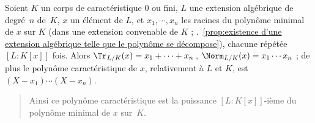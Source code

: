 \documentclass[11pt, %
  title in boldface,
  theorem in new line,
  theorem numbering = section,
  number theorems separately,
  simple name,
]{beaulivre}
\begin{document}
    \begin{proposition}\label{prop:trace;norme;polynôme caractéristique;extension}
        Soient \( K \) un corps de caractéristique \( 0 \) ou fini, \( L \) une extension algébrique de degré~\( n \) de~\( K \), \( x \) un élément de \( L \), et \( x_1, \cdots, x_n \) les racines du polynôme minimal de \( x \) sur \( K \) (dans une extension convenable de \( K \) ; \cf.~\cref{prop:existence d'une extension algébrique telle que le polynôme se décompose}), chacune répétée \( [L:K[x]] \) fois. Alors \( \Tr_{L/K}(x) = x_1 + \cdots + x_n \)\,, \( \Norm_{L/K}(x) = x_1 \cdots x_n \) ; de plus le polynôme caractéristique de \( x \), relativement à \( L \) et \( K \), est \( (X-x_1) \cdots (X-x_n) \).
    \end{proposition}
    \begin{quote}
        Ainsi ce polynôme caractéristique est la puissance \( [L:K[x]] \)‑ième du polynôme minimal de \( x \) sur~\( K \).
    \end{quote}
\end{document}
